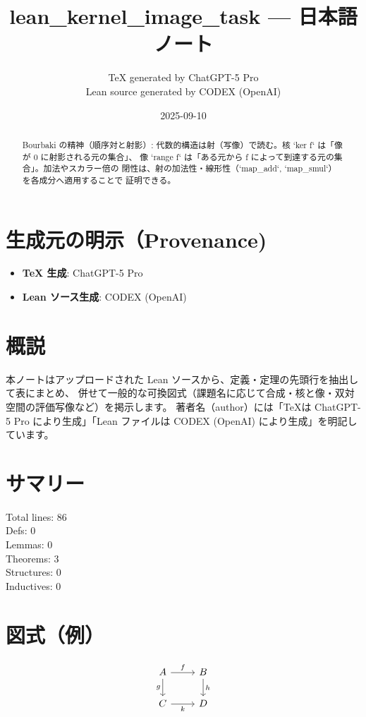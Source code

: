 \documentclass[12pt]{article}
\title{lean\_kernel\_image\_task — 日本語ノート}
\author{TeX generated by ChatGPT-5 Pro\\Lean source generated by CODEX (OpenAI)}
\date{2025-09-10}
\begin{document}
\maketitle

\begin{abstract}
Bourbaki の精神（順序対と射影）:
  代数的構造は射（写像）で読む。核 `ker f` は「像が 0 に射影される元の集合」、
  像 `range f` は「ある元から f によって到達する元の集合」。加法やスカラー倍の
  閉性は、射の加法性・線形性（`map_add`, `map_smul`）を各成分へ適用することで
  証明できる。
\end{abstract}

\section*{生成元の明示（Provenance)}
\begin{itemize}
  \item \textbf{TeX 生成}: ChatGPT-5 Pro
  \item \textbf{Lean ソース生成}: CODEX (OpenAI)
\end{itemize}

\section*{概説}
本ノートはアップロードされた Lean ソースから、定義・定理の先頭行を抽出して表にまとめ、
併せて一般的な可換図式（課題名に応じて合成・核と像・双対空間の評価写像など）を掲示します。
著者名（author）には「TeXは ChatGPT-5 Pro により生成」「Lean ファイルは CODEX (OpenAI) により生成」を明記しています。

\section*{サマリー}
Total lines: 86\\
Defs: 0\\
Lemmas: 0\\
Theorems: 3\\
Structures: 0\\
Inductives: 0

\section*{図式（例）}

\[
\begin{tikzcd}
A \arrow[r, "f"] \arrow[d, "g"'] & B \arrow[d, "h"] \\
C \arrow[r, "k"'] & D
\end{tikzcd}
\]
\end{document}
